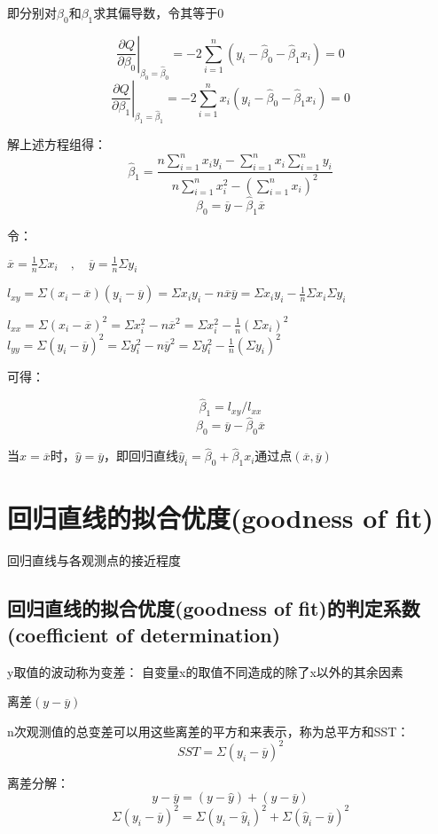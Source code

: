 \documentclass[UTF8,10pt]{book}
\begin{document}
即分别对$\beta_0$和$\beta_1$求其偏导数，令其等于0 

$$ \left. \frac{\partial Q}{\partial \beta_0}\right|_{\beta_0 = \hat{\beta}_0} = -2 \sum_{i=1}^n (y_i - \hat{\beta}_0 - \hat{\beta}_1 x_i) = 0 $$ 
$$ \left. \frac{\partial Q}{\partial \beta_1}\right|_{\beta_1 = \hat{\beta}_1} = -2 \sum_{i=1}^n x_i(y_i - \hat{\beta}_0 - \hat{\beta}_1 x_i) = 0 $$ 

解上述方程组得： 
$$ \hat{\beta}_1 = \frac{n \sum_{i=1}^n x_i y_i - \sum_{i=1}^n x_i \sum_{i=1}^n y_i}{n \sum_{i=1}^n x_i^2 - \left(\sum_{i=1}^n x_i\right)^2} $$ 
$$\hat{\beta}_0 = \overline{y} - \hat{\beta}_1 \overline{x}$$ 

令： 

$ \overline{x}=\frac{1}{n}\Sigma x_i \quad , \quad \overline{y}=\frac{1}{n}\Sigma y_i $ 

$ l_{xy} = \Sigma(x_i-\overline{x})(y_i-\overline{y}) = \Sigma x_i y_i - n\overline{x}\overline{y} = \Sigma x_i y_i - \frac{1}{n}\Sigma x_i \Sigma y_i $ 

$ l_{xx} = \Sigma (x_i - \overline{x})^2 = \Sigma x_i^2 - n \overline{x}^2= \Sigma x_i^2 - \frac{1}{n}(\Sigma x_i)^2 $ $ l_{yy} = \Sigma (y_i - \overline{y})^2 = \Sigma y_i^2 - n \overline{y}^2= \Sigma y_i^2 - \frac{1}{n}(\Sigma y_i)^2 $ 

可得： 

$$ \hat{\beta}_1 = l_{xy} / l_{xx} $$ 
$$ \hat{\beta}_0 = \overline{y} - \hat{\beta}_0 \overline{x} $$ 

当$x=\overline{x}$时，$\hat{y}=\overline{y}$，即回归直线$\hat{y}_i=\hat{\beta}_0+\hat{\beta}_1 x_i$通过点$(\overline{x},\overline{y})$

\section{回归直线的拟合优度(goodness of fit)}	

回归直线与各观测点的接近程度
\subsection{回归直线的拟合优度(goodness of fit)的判定系数(coefficient of determination)}	
y取值的波动称为变差： 自变量x的取值不同造成的除了x以外的其余因素 

离差$(y-\overline{y})$ 

n次观测值的总变差可以用这些离差的平方和来表示，称为总平方和SST： 
$$SST = \Sigma(y_i - \overline{y})^2$$ 

离差分解： 
$$ y-\overline{y} = (y-\hat{y})+(\hat{y}-\overline{y}) $$ 
$$ \Sigma (y_i-\overline{y})^2 = \Sigma (y_i-\hat{y}_i)^2+\Sigma(\hat{y}_i-\overline{y})^2 $$ 
\end{document}
